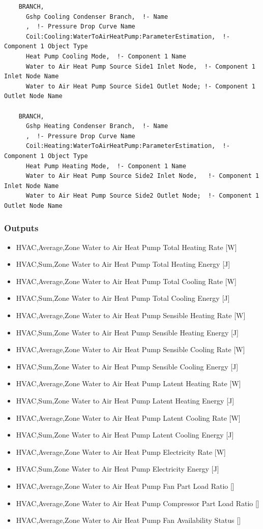\begin{lstlisting}
    BRANCH,
      Gshp Cooling Condenser Branch,  !- Name
      ,  !- Pressure Drop Curve Name
      Coil:Cooling:WaterToAirHeatPump:ParameterEstimation,  !- Component 1 Object Type
      Heat Pump Cooling Mode,  !- Component 1 Name
      Water to Air Heat Pump Source Side1 Inlet Node,  !- Component 1 Inlet Node Name
      Water to Air Heat Pump Source Side1 Outlet Node; !- Component 1 Outlet Node Name

    BRANCH,
      Gshp Heating Condenser Branch,  !- Name
      ,  !- Pressure Drop Curve Name
      Coil:Heating:WaterToAirHeatPump:ParameterEstimation,  !- Component 1 Object Type
      Heat Pump Heating Mode,  !- Component 1 Name
      Water to Air Heat Pump Source Side2 Inlet Node,   !- Component 1 Inlet Node Name
      Water to Air Heat Pump Source Side2 Outlet Node;  !- Component 1 Outlet Node Name
\end{lstlisting}

\subsubsection{Outputs}\label{outputs-9-009}

\begin{itemize}
\item
  HVAC,Average,Zone Water to Air Heat Pump Total Heating Rate {[}W{]}
\item
  HVAC,Sum,Zone Water to Air Heat Pump Total Heating Energy {[}J{]}
\item
  HVAC,Average,Zone Water to Air Heat Pump Total Cooling Rate {[}W{]}
\item
  HVAC,Sum,Zone Water to Air Heat Pump Total Cooling Energy {[}J{]}
\item
  HVAC,Average,Zone Water to Air Heat Pump Sensible Heating Rate {[}W{]}
\item
  HVAC,Sum,Zone Water to Air Heat Pump Sensible Heating Energy {[}J{]}
\item
  HVAC,Average,Zone Water to Air Heat Pump Sensible Cooling Rate {[}W{]}
\item
  HVAC,Sum,Zone Water to Air Heat Pump Sensible Cooling Energy {[}J{]}
\item
  HVAC,Average,Zone Water to Air Heat Pump Latent Heating Rate {[}W{]}
\item
  HVAC,Sum,Zone Water to Air Heat Pump Latent Heating Energy {[}J{]}
\item
  HVAC,Average,Zone Water to Air Heat Pump Latent Cooling Rate {[}W{]}
\item
  HVAC,Sum,Zone Water to Air Heat Pump Latent Cooling Energy {[}J{]}
\item
  HVAC,Average,Zone Water to Air Heat Pump Electricity Rate {[}W{]}
\item
  HVAC,Sum,Zone Water to Air Heat Pump Electricity Energy {[}J{]}
\item
  HVAC,Average,Zone Water to Air Heat Pump Fan Part Load Ratio {[]}
\item
  HVAC,Average,Zone Water to Air Heat Pump Compressor Part Load Ratio {[]}
\item
  HVAC,Average,Zone Water to Air Heat Pump Fan Availability Status {[]}
\end{itemize}

